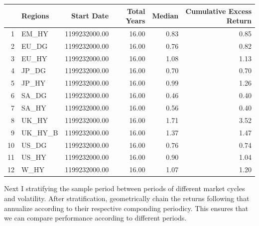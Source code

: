 \documentclass[11pt,preprint, authoryear]{elsarticle}
\let\origtable\table
\let\endorigtable\endtable
\renewenvironment{table}[1][2] {
    \expandafter\origtable\expandafter[H]
} {
    \endorigtable
}
\numberwithin{equation}{section}
\numberwithin{figure}{section}
\numberwithin{table}{section}
\begin{document}
\begin{table}[H]
\centering
\begin{tabular}{rlrrrr}
  \hline
 & Regions & Start Date & Total Years & Median & Cumulative Excess Return \\ 
  \hline
1 & EM\_HY & 1199232000.00 & 16.00 & 0.83 & 0.85 \\ 
  2 & EU\_DG & 1199232000.00 & 16.00 & 0.76 & 0.82 \\ 
  3 & EU\_HY & 1199232000.00 & 16.00 & 1.08 & 1.13 \\ 
  4 & JP\_DG & 1199232000.00 & 16.00 & 0.70 & 0.70 \\ 
  5 & JP\_HY & 1199232000.00 & 16.00 & 0.99 & 1.26 \\ 
  6 & SA\_DG & 1199232000.00 & 16.00 & 0.46 & 0.40 \\ 
  7 & SA\_HY & 1199232000.00 & 16.00 & 0.56 & 0.40 \\ 
  8 & UK\_HY & 1199232000.00 & 16.00 & 1.71 & 3.52 \\ 
  9 & UK\_HY\_B & 1199232000.00 & 16.00 & 1.37 & 1.47 \\ 
  10 & US\_DG & 1199232000.00 & 16.00 & 0.76 & 0.74 \\ 
  11 & US\_HY & 1199232000.00 & 16.00 & 0.90 & 1.04 \\ 
  12 & W\_HY & 1199232000.00 & 16.00 & 1.07 & 1.20 \\ 
   \hline
\end{tabular}
\caption{Cumulative Excess Return \label{tab1}} 
\end{table}

Next I stratifying the sample period between periods of different market
cycles and volatility. After stratification, geometrically chain the
returns following that annualize according to their respective
componding periodicy. This ensures that we can compare performance
according to different periods.
\begingroup\fontsize{12pt}{13pt}\selectfont
\end{document}
